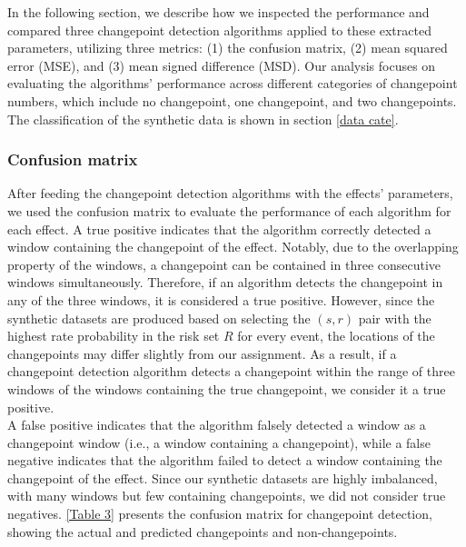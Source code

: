 \documentclass[]{interact}
\theoremstyle{plain}%
\theoremstyle{definition}
\theoremstyle{remark}
\begin{document}
{	In the following section, we describe how we inspected the performance and compared three changepoint detection algorithms applied to these extracted parameters, utilizing three metrics: (1) the confusion matrix, (2) mean squared error (MSE), and (3) mean signed difference (MSD). Our analysis focuses on evaluating the algorithms' performance across different categories of changepoint numbers, which include no changepoint, one changepoint, and two changepoints. The classification of the synthetic data is shown in section \ref{data cate}.
	
	\subsubsection{Confusion matrix} \label{sec:confusion matrix}
	
	\hspace{0.28cm} After feeding the changepoint detection algorithms with the effects' parameters, we used the confusion matrix to evaluate the performance of each algorithm for each effect. A true positive indicates that the algorithm correctly detected a window containing the changepoint of the effect. Notably, due to the overlapping property of the windows, a changepoint can be contained in three consecutive windows simultaneously. Therefore, if an algorithm detects the changepoint in any of the three windows, it is considered a true positive. However, since the synthetic datasets are produced based on selecting the $(s,r)$ pair with the highest rate probability in the risk set $R$ for every event, the locations of the changepoints may differ slightly from our assignment. As a result, if a changepoint detection algorithm detects a changepoint within the range of three windows of the windows containing the true changepoint, we consider it a true positive. \\
	
	A false positive indicates that the algorithm falsely detected a window as a changepoint window (i.e., a window containing a changepoint), while a false negative indicates that the algorithm failed to detect a window containing the changepoint of the effect. Since our synthetic datasets are highly imbalanced, with many windows but few containing changepoints, we did not consider true negatives. \autoref{Table 3} presents the confusion matrix for changepoint detection, showing the actual and predicted changepoints and non-changepoints.
	
}
\end{document}
